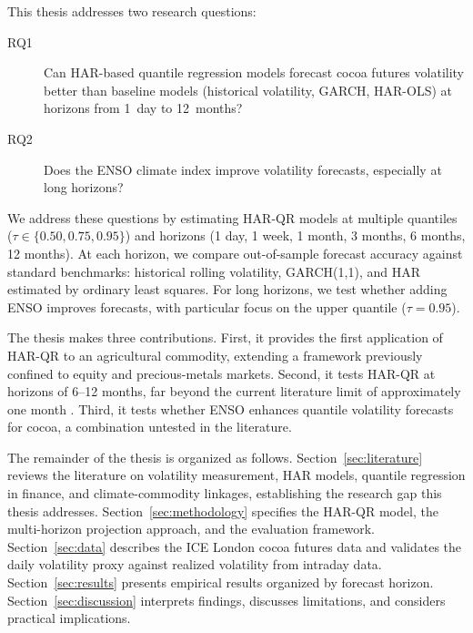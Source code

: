 This thesis addresses two research questions:
\begin{description}
  \item[RQ1] Can HAR-based quantile regression models forecast cocoa futures
    volatility better than baseline models (historical volatility, GARCH,
    HAR-OLS) at horizons from 1~day to 12~months?
  \item[RQ2] Does the ENSO climate index improve volatility forecasts,
    especially at long horizons?
\end{description}

We address these questions by estimating HAR-QR models at multiple quantiles
($\tau \in \{0.50, 0.75, 0.95\}$) and horizons (1 day, 1 week,
1 month, 3 months, 6 months, 12 months). At each horizon, we compare
out-of-sample forecast accuracy against standard benchmarks: historical
rolling volatility, GARCH(1,1), and HAR estimated by ordinary least squares.
For long horizons, we test whether adding ENSO improves forecasts, with
particular focus on the upper quantile ($\tau = 0.95$).

The thesis makes three contributions. First, it provides the first application
of HAR-QR to an agricultural commodity, extending a framework previously confined
to equity and precious-metals markets. Second, it tests HAR-QR at horizons of
6--12 months, far beyond the current literature limit of approximately one
month \parencite{lyocsaImprovingStockMarket2021}. Third, it tests whether ENSO
enhances quantile volatility forecasts for cocoa, a combination untested in the
literature.

The remainder of the thesis is organized as follows.
Section~\ref{sec:literature} reviews the literature on volatility measurement,
HAR models, quantile regression in finance, and climate-commodity linkages,
establishing the research gap this thesis addresses.
Section~\ref{sec:methodology} specifies the HAR-QR model, the multi-horizon
projection approach, and the evaluation framework.
Section~\ref{sec:data} describes the ICE London cocoa futures data and validates
the daily volatility proxy against realized volatility from intraday data.
Section~\ref{sec:results} presents empirical results organized by forecast
horizon.
Section~\ref{sec:discussion} interprets findings, discusses limitations,
and considers practical implications.

